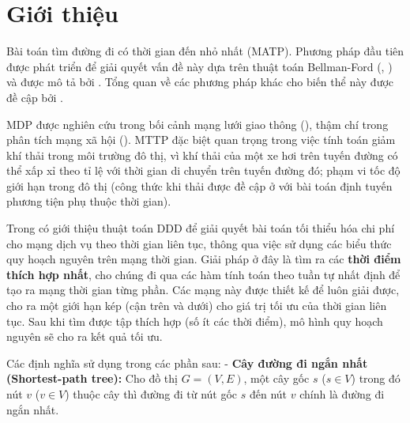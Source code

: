 \documentclass[../main.tex]{subfiles}
\begin{document}
\chapter{Giới thiệu}\label{introduce}


Bài toán tìm đường đi có thời gian đến nhỏ nhất (MATP). Phương pháp đầu
tiên được phát triển để giải quyết vấn đề này dựa trên thuật toán
Bellman-Ford (\cite{bellman1958routing}, \cite{ford2010flows}) và được mô tả bởi
\cite{cooke1966shortest}. Tổng quan về các phương pháp khác cho biến thể
này được đề cập bởi \cite{dean2004shortest}.

MDP được nghiên cứu trong bối cảnh mạng lưới giao thông (\cite{demiryurek2011online}), thậm chí trong phân tích mạng xã hội (\cite{gunturi2012information}).
MTTP đặc biệt quan trọng trong việc tính toán giảm khí thải trong môi
trường đô thị, vì khí thải của một xe hơi trên tuyến đường có thể xấp xỉ
theo tỉ lệ với thời gian di chuyển trên tuyến đường đó; phạm vi tốc độ
giới hạn trong đô thị (công thức khi thải được đề cập ở \cite{jabali2012analysis} với bài toán định tuyến phương tiện phụ thuộc thời gian).

Trong \cite{boland2017continuous} có giới thiệu thuật toán DDD để giải quyết bài
toán tối thiểu hóa chi phí cho mạng dịch vụ theo thời gian liên tục,
thông qua việc sử dụng các biểu thức quy hoạch nguyên trên mạng thời
gian. Giải pháp ở đây là tìm ra các \textbf{thời điểm thích hợp nhất},
cho chúng đi qua các hàm tính toán theo tuần tự nhất định để tạo ra mạng
thời gian từng phần. Các mạng này được thiết kế để luôn giải được, cho
ra một giới hạn kép (cận trên và dưới) cho giá trị tối ưu của thời gian
liên tục. Sau khi tìm được tập thích hợp (số ít các thời điểm), mô hình
quy hoạch nguyên sẽ cho ra kết quả tối ưu.



Các định nghĩa sử dụng trong các phần sau: - \textbf{Cây đường đi ngắn
nhất (Shortest-path tree):} Cho đồ thị \(G=(V,E)\), một cây gốc \(s\)
(\(s\in V\)) trong đó nút \(v\) (\(v\in V\)) thuộc cây thì đường đi từ
nút gốc \(s\) đến nút \(v\) chính là đường đi ngắn nhất.
\backmatter
\end{document}
